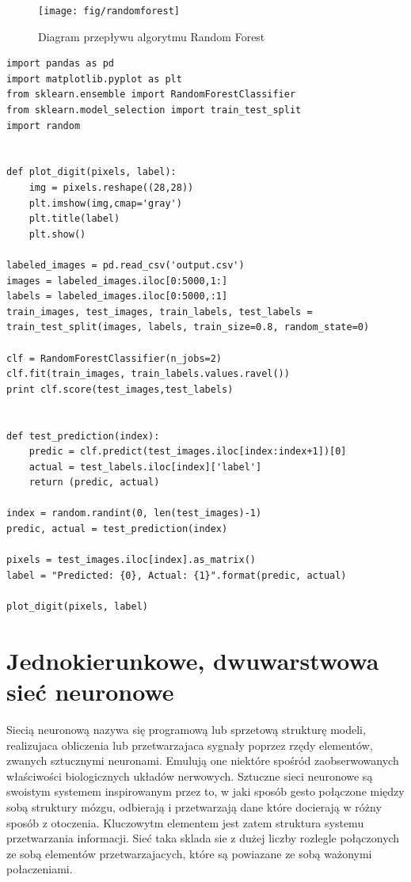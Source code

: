 \documentclass[brudnopis]{xmgr}
\begin{document}
\begin{figure}[!tbh]
\centering
\texttt{[image: fig/randomforest]}
\caption{Diagram przepływu algorytmu Random Forest}
\end{figure}
\newpage

\begin{lstlisting}
import pandas as pd
import matplotlib.pyplot as plt
from sklearn.ensemble import RandomForestClassifier
from sklearn.model_selection import train_test_split
import random


def plot_digit(pixels, label):
    img = pixels.reshape((28,28))
    plt.imshow(img,cmap='gray')
    plt.title(label)
    plt.show()

labeled_images = pd.read_csv('output.csv')
images = labeled_images.iloc[0:5000,1:]
labels = labeled_images.iloc[0:5000,:1]
train_images, test_images, train_labels, test_labels = train_test_split(images, labels, train_size=0.8, random_state=0)

clf = RandomForestClassifier(n_jobs=2)
clf.fit(train_images, train_labels.values.ravel())
print clf.score(test_images,test_labels)


def test_prediction(index):
    predic = clf.predict(test_images.iloc[index:index+1])[0]
    actual = test_labels.iloc[index]['label']
    return (predic, actual)

index = random.randint(0, len(test_images)-1)
predic, actual = test_prediction(index)

pixels = test_images.iloc[index].as_matrix()
label = "Predicted: {0}, Actual: {1}".format(predic, actual)

plot_digit(pixels, label)
\end{lstlisting}

\section{Jednokierunkowe, dwuwarstwowa sieć neuronowe}

Siecią neuronową nazywa się programową lub sprzetową strukturę modeli, realizujaca obliczenia lub przetwarzajaca sygnały poprzez rzędy elementów, zwanych sztucznymi neuronami. Emulują one niektóre spośród zaobserwowanych właściwości biologicznych układów nerwowych. Sztuczne sieci neuronowe są swoistym systemem inspirowanym przez to, w jaki sposób gesto połączone między sobą struktury mózgu, odbierają i przetwarzają dane które docierają w różny sposób z otoczenia. Kluczowytm elementem jest zatem struktura systemu przetwarzania informacji. Sieć taka sklada sie z dużej liczby rozlegle połączonych ze sobą elementów przetwarzajacych, które są powiazane ze sobą ważonymi połaczeniami.
\end{document}
